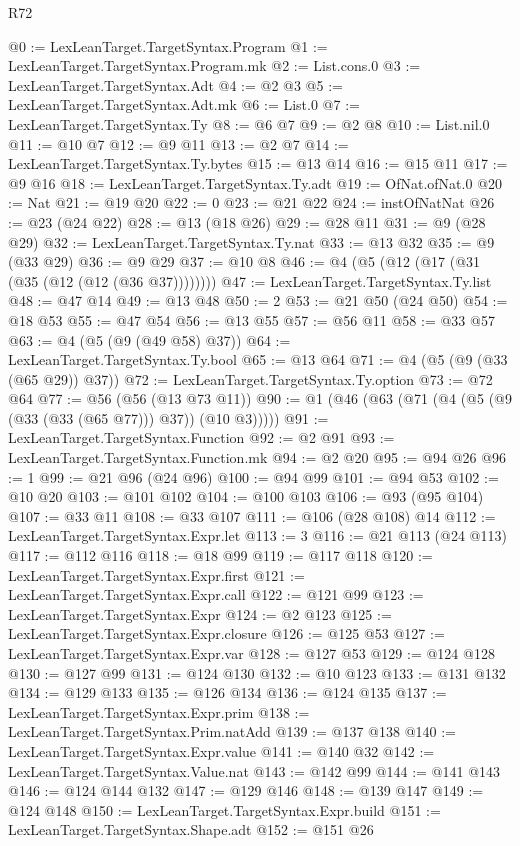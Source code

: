 \begin{lexlean}{R72}
\begin{coremodule}
@0 := LexLeanTarget.TargetSyntax.Program
@1 := LexLeanTarget.TargetSyntax.Program.mk
@2 := List.cons.{0}
@3 := LexLeanTarget.TargetSyntax.Adt
@4 := @2 @3
@5 := LexLeanTarget.TargetSyntax.Adt.mk
@6 := List.{0}
@7 := LexLeanTarget.TargetSyntax.Ty
@8 := @6 @7
@9 := @2 @8
@10 := List.nil.{0}
@11 := @10 @7
@12 := @9 @11
@13 := @2 @7
@14 := LexLeanTarget.TargetSyntax.Ty.bytes
@15 := @13 @14
@16 := @15 @11
@17 := @9 @16
@18 := LexLeanTarget.TargetSyntax.Ty.adt
@19 := OfNat.ofNat.{0}
@20 := Nat
@21 := @19 @20
@22 := 0
@23 := @21 @22
@24 := instOfNatNat
@26 := @23 (@24 @22)
@28 := @13 (@18 @26)
@29 := @28 @11
@31 := @9 (@28 @29)
@32 := LexLeanTarget.TargetSyntax.Ty.nat
@33 := @13 @32
@35 := @9 (@33 @29)
@36 := @9 @29
@37 := @10 @8
@46 := @4 (@5 (@12 (@17 (@31 (@35 (@12 (@12 (@36 @37))))))))
@47 := LexLeanTarget.TargetSyntax.Ty.list
@48 := @47 @14
@49 := @13 @48
@50 := 2
@53 := @21 @50 (@24 @50)
@54 := @18 @53
@55 := @47 @54
@56 := @13 @55
@57 := @56 @11
@58 := @33 @57
@63 := @4 (@5 (@9 (@49 @58) @37))
@64 := LexLeanTarget.TargetSyntax.Ty.bool
@65 := @13 @64
@71 := @4 (@5 (@9 (@33 (@65 @29)) @37))
@72 := LexLeanTarget.TargetSyntax.Ty.option
@73 := @72 @64
@77 := @56 (@56 (@13 @73 @11))
@90 := @1 (@46 (@63 (@71 (@4 (@5 (@9 (@33 (@33 (@65 @77))) @37)) (@10 @3)))))
@91 := LexLeanTarget.TargetSyntax.Function
@92 := @2 @91
@93 := LexLeanTarget.TargetSyntax.Function.mk
@94 := @2 @20
@95 := @94 @26
@96 := 1
@99 := @21 @96 (@24 @96)
@100 := @94 @99
@101 := @94 @53
@102 := @10 @20
@103 := @101 @102
@104 := @100 @103
@106 := @93 (@95 @104)
@107 := @33 @11
@108 := @33 @107
@111 := @106 (@28 @108) @14
@112 := LexLeanTarget.TargetSyntax.Expr.let
@113 := 3
@116 := @21 @113 (@24 @113)
@117 := @112 @116
@118 := @18 @99
@119 := @117 @118
@120 := LexLeanTarget.TargetSyntax.Expr.first
@121 := LexLeanTarget.TargetSyntax.Expr.call
@122 := @121 @99
@123 := LexLeanTarget.TargetSyntax.Expr
@124 := @2 @123
@125 := LexLeanTarget.TargetSyntax.Expr.closure
@126 := @125 @53
@127 := LexLeanTarget.TargetSyntax.Expr.var
@128 := @127 @53
@129 := @124 @128
@130 := @127 @99
@131 := @124 @130
@132 := @10 @123
@133 := @131 @132
@134 := @129 @133
@135 := @126 @134
@136 := @124 @135
@137 := LexLeanTarget.TargetSyntax.Expr.prim
@138 := LexLeanTarget.TargetSyntax.Prim.natAdd
@139 := @137 @138
@140 := LexLeanTarget.TargetSyntax.Expr.value
@141 := @140 @32
@142 := LexLeanTarget.TargetSyntax.Value.nat
@143 := @142 @99
@144 := @141 @143
@146 := @124 @144 @132
@147 := @129 @146
@148 := @139 @147
@149 := @124 @148
@150 := LexLeanTarget.TargetSyntax.Expr.build
@151 := LexLeanTarget.TargetSyntax.Shape.adt
@152 := @151 @26

\end{coremodule}
\end{lexlean}
